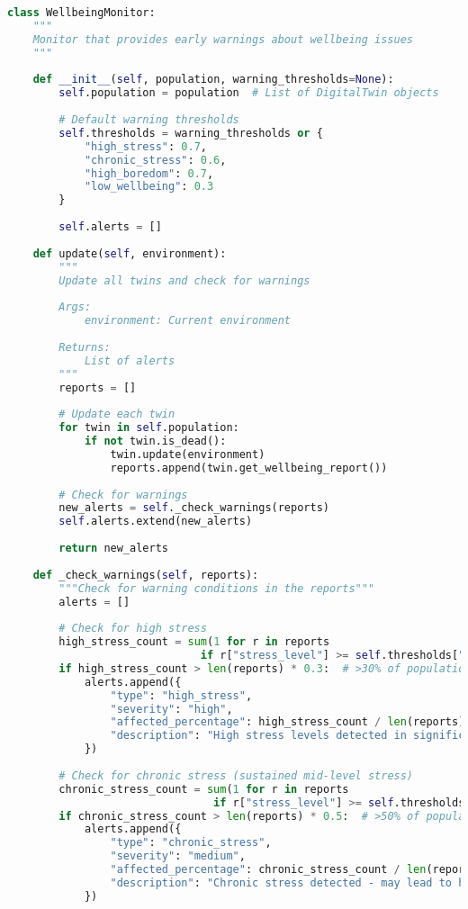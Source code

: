 \documentclass[11pt,a4paper]{article}
\begin{document}
\begin{lstlisting}[language=Python]
class WellbeingMonitor:
    """
    Monitor that provides early warnings about wellbeing issues
    """
    
    def __init__(self, population, warning_thresholds=None):
        self.population = population  # List of DigitalTwin objects
        
        # Default warning thresholds
        self.thresholds = warning_thresholds or {
            "high_stress": 0.7,
            "chronic_stress": 0.6,
            "high_boredom": 0.7,
            "low_wellbeing": 0.3
        }
        
        self.alerts = []
        
    def update(self, environment):
        """
        Update all twins and check for warnings
        
        Args:
            environment: Current environment
            
        Returns:
            List of alerts
        """
        reports = []
        
        # Update each twin
        for twin in self.population:
            if not twin.is_dead():
                twin.update(environment)
                reports.append(twin.get_wellbeing_report())
                
        # Check for warnings
        new_alerts = self._check_warnings(reports)
        self.alerts.extend(new_alerts)
        
        return new_alerts
        
    def _check_warnings(self, reports):
        """Check for warning conditions in the reports"""
        alerts = []
        
        # Check for high stress
        high_stress_count = sum(1 for r in reports 
                              if r["stress_level"] >= self.thresholds["high_stress"])
        if high_stress_count > len(reports) * 0.3:  # >30% of population
            alerts.append({
                "type": "high_stress",
                "severity": "high",
                "affected_percentage": high_stress_count / len(reports) * 100,
                "description": "High stress levels detected in significant portion of population"
            })
        
        # Check for chronic stress (sustained mid-level stress)
        chronic_stress_count = sum(1 for r in reports
                                if r["stress_level"] >= self.thresholds["chronic_stress"])
        if chronic_stress_count > len(reports) * 0.5:  # >50% of population
            alerts.append({
                "type": "chronic_stress",
                "severity": "medium",
                "affected_percentage": chronic_stress_count / len(reports) * 100,
                "description": "Chronic stress detected - may lead to health issues"
            })
        

\end{lstlisting}
\end{document}

